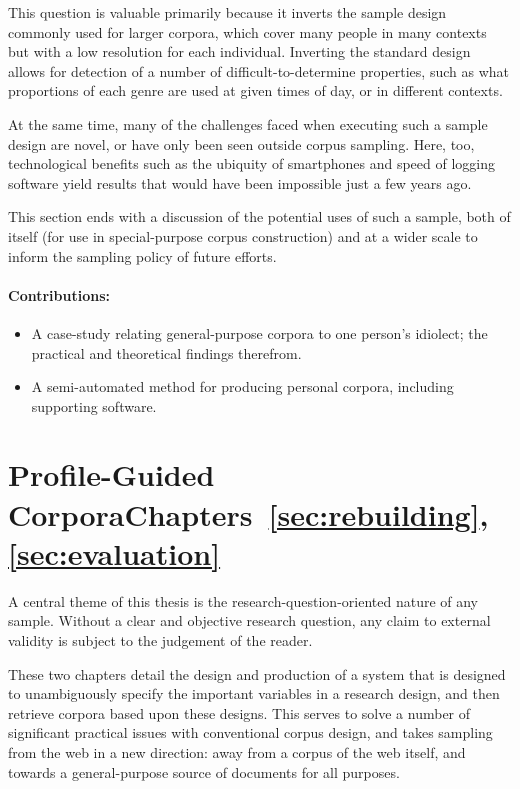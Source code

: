 This question is valuable primarily because it inverts the sample design commonly used for larger corpora, which cover many people in many contexts but with a low resolution for each individual.
Inverting the standard design allows for detection of a number of difficult-to-determine properties, such as what proportions of each genre are used at given times of day, or in different contexts.

At the same time, many of the challenges faced when executing such a sample design are novel, or have only been seen outside corpus sampling.  Here, too, technological benefits such as the ubiquity of smartphones and speed of logging software yield results that would have been impossible just a few years ago.

This section ends with a discussion of the potential uses of such a sample, both of itself (for use in special-purpose corpus construction) and at a wider scale to inform the sampling policy of future efforts.

\paragraph{Contributions:}
\begin{itemize}
    \item A case-study relating general-purpose corpora to one person's idiolect; the practical and theoretical findings therefrom.
    \item A semi-automated method for producing personal corpora, including supporting software.
\end{itemize}


\section{Profile-Guided Corpora\hfill{}Chapters~\ref{sec:rebuilding},~\ref{sec:evaluation}}
A central theme of this thesis is the research-question-oriented nature of any sample.  Without a clear and objective research question, any claim to external validity is subject to the judgement of the reader.

These two chapters detail the design and production of a system that is designed to unambiguously specify the important variables in a research design, and then retrieve corpora based upon these designs.  This serves to solve a number of significant practical issues with conventional corpus design, and takes sampling from the web in a new direction: away from a corpus of the web itself, and towards a general-purpose source of documents for all purposes.

